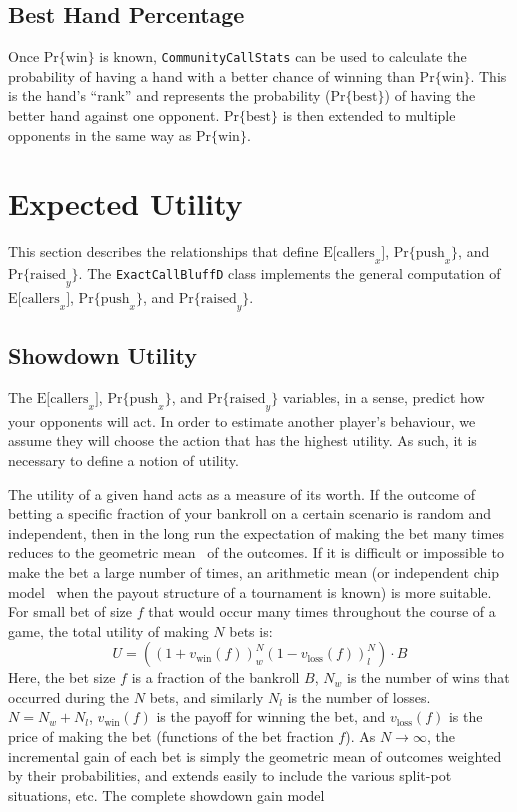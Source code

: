 \subsection{Best Hand Percentage}
\label{sec:Rank}
Once $\mathrm{Pr\{win\}}$ is known, \texttt{CommunityCallStats} can be used to calculate the probability of having a hand with a better chance of winning than $\mathrm{Pr\{win\}}$.
This is the hand's ``rank'' and represents the probability ($\mathrm{Pr\{best\}}$) of having the better hand against one opponent.
$\mathrm{Pr\{best\}}$ is then extended to multiple opponents in the same way as $\mathrm{Pr\{win\}}$.


\section{Expected Utility}

This section describes the relationships that define $\mathrm{E[callers}_x]$, $\mathrm{Pr\{push}_x\}$, and $\mathrm{Pr\{raised}_y\}$.
The \texttt{ExactCallBluffD} class implements the general computation of $\mathrm{E[callers}_x]$, $\mathrm{Pr\{push}_x\}$, and $\mathrm{Pr\{raised}_y\}$.

\subsection{Showdown Utility}
\label{sec:Utility}
The $\mathrm{E[callers}_x]$, $\mathrm{Pr\{push}_x\}$, and $\mathrm{Pr\{raised}_y\}$ variables, in a sense, predict how your opponents will act.
In order to estimate another player's behaviour, we assume they will choose the action that has the highest utility.
As such, it is necessary to define a notion of utility.

The utility of a given hand acts as a measure of its worth.
If the outcome of betting a specific fraction of your bankroll on a certain scenario is random and independent, then in the long run the expectation of making the bet many times reduces to the geometric mean~\cite{KellyCriterion} of the outcomes.
If it is difficult or impossible to make the bet a large number of times, an arithmetic mean (or independent chip model~\cite{ICMmag2007} when the payout structure of a tournament is known) is more suitable.
For small bet of size $f$ that would occur many times throughout the course of a game, the total utility of making $N$ bets is:
\[
U = \left( \left( 1 + v_{\mathrm{win}} \left( f \right) \right)^N_w \left( 1 - v_{\mathrm{loss}} \left( f \right) \right)^N_l \right) \cdot B
\]
Here, the bet size $f$ is a fraction of the bankroll $B$, $N_w$ is the number of wins that occurred during the $N$ bets, and similarly $N_l$ is the number of losses.
$N = N_w + N_l$, $v_{\mathrm{win}} \left( f \right)$ is the payoff for winning the bet, and $v_{\mathrm{loss}} \left( f \right)$ is the price of making the bet (functions of the bet fraction $f$).
As $N \to \infty$, the incremental gain of each bet is simply the geometric mean of outcomes weighted by their probabilities, and extends easily to include the various split-pot situations, etc.
The complete showdown gain model 

